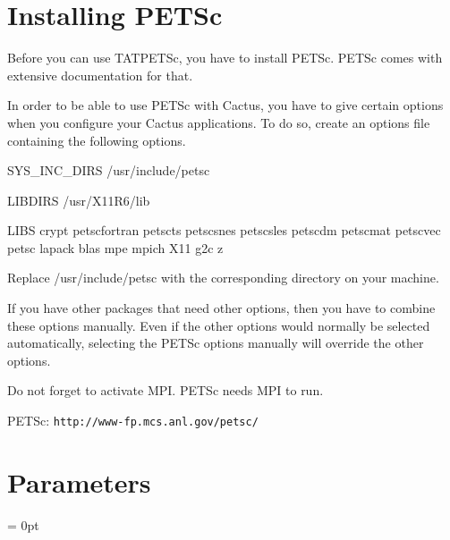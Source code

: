 \documentclass[12pt]{article}
\newlength{\tableWidth} \newlength{\maxVarWidth} \newlength{\paraWidth} \newlength{\descWidth}
\begin{document}
\section{Installing PETSc}

Before you can use TATPETSc, you have to install PETSc.  PETSc comes
with extensive documentation for that.

In order to be able to use PETSc with Cactus, you have to give certain
options when you configure your Cactus applications.  To do so, create
an options file containing the following options.

\begin{description}
   \item{SYS\_INC\_DIRS} /usr/include/petsc

   \item{LIBDIRS} /usr/X11R6/lib

   \item{LIBS} crypt petscfortran petscts petscsnes petscsles petscdm
   petscmat petscvec petsc lapack blas mpe mpich X11 g2c z
\end{description}

Replace /usr/include/petsc with the corresponding directory on your
machine.

If you have other packages that need other options, then you have to
combine these options manually.  Even if the other options would
normally be selected automatically, selecting the PETSc options
manually will override the other options.

Do not forget to activate MPI.  PETSc needs MPI to run.

\begin{thebibliography}{99}
    PETSc:
   \verb+http://www-fp.mcs.anl.gov/petsc/+
\end{thebibliography}



\section{Parameters} 


\parskip = 0pt

\setlength{\tableWidth}{160mm}

\setlength{\paraWidth}{\tableWidth}
\setlength{\descWidth}{\tableWidth}
\settowidth{\maxVarWidth}{veryverbose}

\addtolength{\paraWidth}{-\maxVarWidth}
\addtolength{\paraWidth}{-\columnsep}
\addtolength{\paraWidth}{-\columnsep}
\addtolength{\paraWidth}{-\columnsep}
\end{document}
